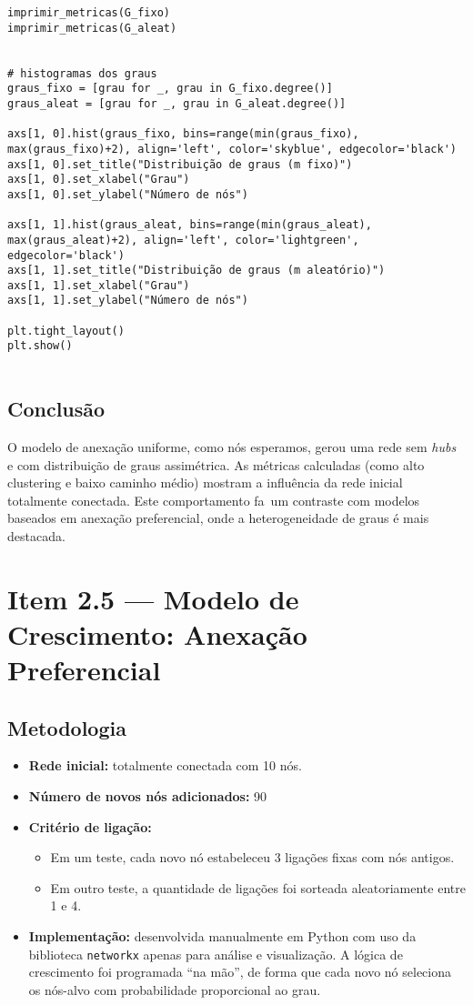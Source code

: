 \documentclass{article}
\begin{document}
\begin{verbatim}
imprimir_metricas(G_fixo)
imprimir_metricas(G_aleat)


# histogramas dos graus
graus_fixo = [grau for _, grau in G_fixo.degree()]
graus_aleat = [grau for _, grau in G_aleat.degree()]

axs[1, 0].hist(graus_fixo, bins=range(min(graus_fixo), max(graus_fixo)+2), align='left', color='skyblue', edgecolor='black')
axs[1, 0].set_title("Distribuição de graus (m fixo)")
axs[1, 0].set_xlabel("Grau")
axs[1, 0].set_ylabel("Número de nós")

axs[1, 1].hist(graus_aleat, bins=range(min(graus_aleat), max(graus_aleat)+2), align='left', color='lightgreen', edgecolor='black')
axs[1, 1].set_title("Distribuição de graus (m aleatório)")
axs[1, 1].set_xlabel("Grau")
axs[1, 1].set_ylabel("Número de nós")

plt.tight_layout()
plt.show()


\end{verbatim}

\subsection*{Conclusão}
O modelo de anexação uniforme, como nós esperamos, gerou uma rede sem \textit{hubs} e com distribuição de graus assimétrica. As métricas calculadas (como alto clustering e baixo caminho médio) mostram a influência da rede inicial totalmente conectada. Este comportamento fa\ um contraste com modelos baseados em anexação preferencial, onde a heterogeneidade de graus é mais destacada.

\newpage

\section*{Item 2.5 — Modelo de Crescimento: Anexação Preferencial}

\subsection*{Metodologia}

\begin{itemize}
    \item \textbf{Rede inicial:} totalmente conectada com 10 nós.
    \item \textbf{Número de novos nós adicionados:} 90
    \item \textbf{Critério de ligação:}
    \begin{itemize}
        \item Em um teste, cada novo nó estabeleceu 3 ligações fixas com nós antigos.
        \item Em outro teste, a quantidade de ligações foi sorteada aleatoriamente entre 1 e 4.
    \end{itemize}
    \item \textbf{Implementação:} desenvolvida manualmente em Python com uso da biblioteca \texttt{networkx} apenas para análise e visualização. A lógica de crescimento foi programada ``na mão'', de forma que cada novo nó seleciona os nós-alvo com probabilidade proporcional ao grau.
\end{itemize}
\end{document}
